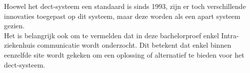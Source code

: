 Hoewel het \gls{dect}-systeem een standaard is sinds 1993, zijn er toch verschillende innovaties toegepast op dit systeem, maar deze worden als een apart systeem gezien. 
\\Het is belangrijk ook om te vermelden dat in deze bachelorproef enkel Intra-ziekenhuis communicatie wordt onderzocht. Dit betekent dat enkel binnen eenzelfde site wordt gekeken om een oplossing of alternatief te bieden voor het \gls{dect}-systeem.

\section{}%
\label{sec:req}%









%


